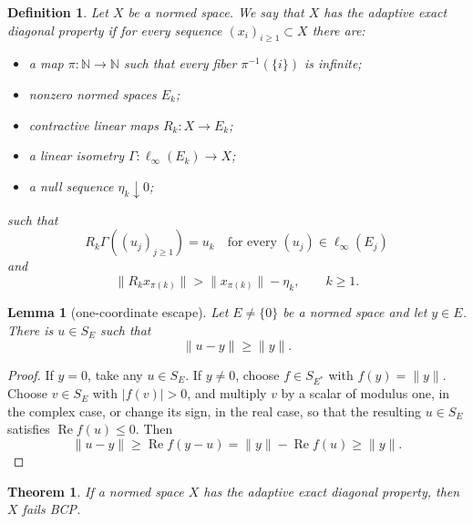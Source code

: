 \documentclass[11pt]{article}
\newtheorem{theorem}{Theorem}
\newtheorem{lemma}{Lemma}
\newtheorem{definition}{Definition}
\newcommand{\N}{\mathbb N}
\begin{document}
\begin{definition}
Let \(X\) be a normed space.  We say that \(X\) has the adaptive exact
diagonal property if for every sequence \((x_i)_{i\ge1}\subset X\) there are:
\begin{itemize}
\item a map \(\pi:\N\to\N\) such that every fiber \(\pi^{-1}(\{i\})\) is
infinite;
\item nonzero normed spaces \(E_k\);
\item contractive linear maps \(R_k:X\to E_k\);
\item a linear isometry \(\Gamma:\ell_\infty(E_k)\to X\);
\item a null sequence \(\eta_k\downarrow0\);
\end{itemize}
such that
\[
        R_k\Gamma((u_j)_{j\ge1})=u_k
        \quad\text{for every }(u_j)\in\ell_\infty(E_j)
\]
and
\[
        \|R_k x_{\pi(k)}\|>\|x_{\pi(k)}\|-\eta_k,\qquad k\ge1.
\]
\end{definition}

\begin{lemma}[one-coordinate escape]
\label{lem:one-coordinate}
Let \(E\ne\{0\}\) be a normed space and let \(y\in E\).  There is
\(u\in S_E\) such that
\[
        \|u-y\|\ge \|y\|.
\]
\end{lemma}

\begin{proof}
If \(y=0\), take any \(u\in S_E\).  If \(y\ne0\), choose
\(f\in S_{E^*}\) with \(f(y)=\|y\|\).  Choose \(v\in S_E\) with
\(|f(v)|>0\), and multiply \(v\) by a scalar of modulus one, in the complex
case, or change its sign, in the real case, so that the resulting
\(u\in S_E\) satisfies \(\operatorname{Re}f(u)\le0\).  Then
\[
        \|u-y\|
        \ge
        \operatorname{Re} f(y-u)
        =
        \|y\|-\operatorname{Re}f(u)
        \ge
        \|y\|.
\]
\end{proof}

\begin{theorem}
\label{thm:abstract-diagonal}
If a normed space \(X\) has the adaptive exact diagonal property, then \(X\)
fails BCP.
\end{theorem}
\end{document}
